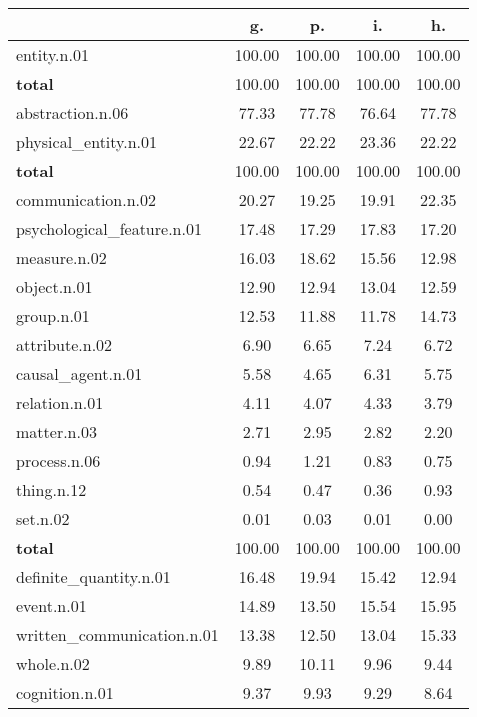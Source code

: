 \begin{table}[h!]
\begin{center}
\begin{tabular}{| l || c | c | c | c |}\hline
 & {\bf g.} & {\bf p.} & {\bf i.} & {\bf h.} \\\hline\hline
entity.n.01 & 100.00  & 100.00  & 100.00  & 100.00 \\\hline\hline
{{\bf total}} & 100.00  & 100.00  & 100.00  & 100.00 \\\hline\hline\hline
abstraction.n.06 & 77.33  & 77.78  & 76.64  & 77.78 \\\hline
physical\_entity.n.01 & 22.67  & 22.22  & 23.36  & 22.22 \\\hline\hline
{{\bf total}} & 100.00  & 100.00  & 100.00  & 100.00 \\\hline\hline\hline
communication.n.02 & 20.27  & 19.25  & 19.91  & 22.35 \\\hline
psychological\_feature.n.01 & 17.48  & 17.29  & 17.83  & 17.20 \\\hline
measure.n.02 & 16.03  & 18.62  & 15.56  & 12.98 \\\hline
object.n.01 & 12.90  & 12.94  & 13.04  & 12.59 \\\hline
group.n.01 & 12.53  & 11.88  & 11.78  & 14.73 \\\hline
attribute.n.02 & 6.90  & 6.65  & 7.24  & 6.72 \\\hline
causal\_agent.n.01 & 5.58  & 4.65  & 6.31  & 5.75 \\\hline
relation.n.01 & 4.11  & 4.07  & 4.33  & 3.79 \\\hline
matter.n.03 & 2.71  & 2.95  & 2.82  & 2.20 \\\hline
process.n.06 & 0.94  & 1.21  & 0.83  & 0.75 \\\hline
thing.n.12 & 0.54  & 0.47  & 0.36  & 0.93 \\\hline
set.n.02 & 0.01  & 0.03  & 0.01  & 0.00 \\\hline\hline
{{\bf total}} & 100.00  & 100.00  & 100.00  & 100.00 \\\hline\hline\hline
definite\_quantity.n.01 & 16.48  & 19.94  & 15.42  & 12.94 \\\hline
event.n.01 & 14.89  & 13.50  & 15.54  & 15.95 \\\hline
written\_communication.n.01 & 13.38  & 12.50  & 13.04  & 15.33 \\\hline
whole.n.02 & 9.89  & 10.11  & 9.96  & 9.44 \\\hline
cognition.n.01 & 9.37  & 9.93  & 9.29  & 8.64 \\\hline

\end{tabular}
\end{center}
\end{table}
